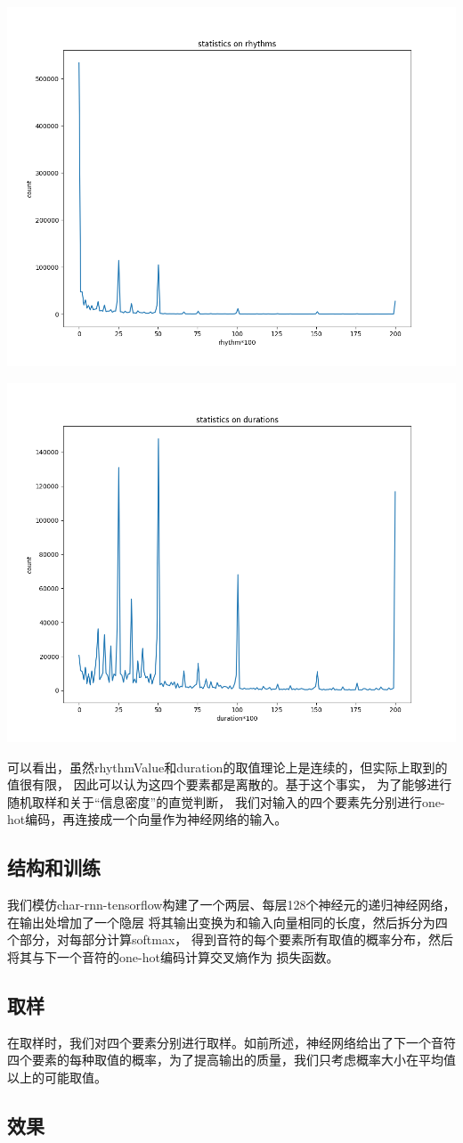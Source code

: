 \documentclass{article}
\begin{document}
    \includegraphics[width=.9\textwidth]{picture/rhythms.png}
    
    \includegraphics[width=.9\textwidth]{picture/durations.png}

    可以看出，虽然rhythmValue和duration的取值理论上是连续的，但实际上取到的值很有限，
    因此可以认为这四个要素都是离散的。基于这个事实，
    为了能够进行随机取样和关于“信息密度”的直觉判断，
    我们对输入的四个要素先分别进行one-hot编码，再连接成一个向量作为神经网络的输入。

  \subsection{结构和训练}
    我们模仿char-rnn-tensorflow构建了一个两层、每层128个神经元的递归神经网络，在输出处增加了一个隐层
    将其输出变换为和输入向量相同的长度，然后拆分为四个部分，对每部分计算softmax，
    得到音符的每个要素所有取值的概率分布，然后将其与下一个音符的one-hot编码计算交叉熵作为
    损失函数。
  \subsection{取样}
    在取样时，我们对四个要素分别进行取样。如前所述，神经网络给出了下一个音符四个要素的每种取值的概率，为了提高输出的质量，我们只考虑概率大小在平均值以上的可能取值。
  \subsection{效果}
\end{document}
